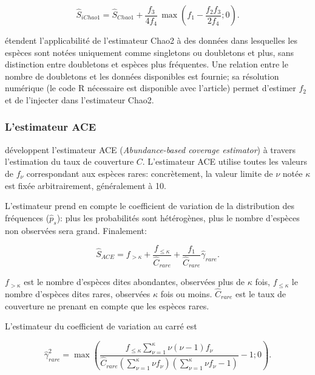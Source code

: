 \documentclass[
  11pt,
  american,
  a4paper,
  extrafontsizes,onecolumn,openright
  ]{memoir}
\begin{document}
\begin{equation}
  \label{eq:iChao1}
  {\hat{S}}_\mathit{iChao1} 
  = {\hat{S}}_\mathit{Chao1} 
    + \frac{f_{3}}{4f_{4}}
    \,\max\left( f_{1} - \frac{f_{2}f_{3}}{2f_{4}} ; 0 \right).
\end{equation}

\textcite{Chao2017} étendent l'applicabilité de l'estimateur Chao2 à des données dans lesquelles les espèces sont notées uniquement comme singletons ou doubletons et plus, sans distinction entre doubletons et espèces plus fréquentes.
Une relation entre le nombre de doubletons et les données disponibles est fournie; sa résolution numérique (le code R nécessaire est disponible avec l'article) permet d'estimer \(f_{2}\) et de l'injecter dans l'estimateur Chao2.

\subsubsection{L'estimateur ACE}\label{lestimateur-ace}

\textcite{Chao1992} développent l'estimateur ACE (\emph{Abundance-based coverage estimator}) à travers l'estimation du taux de couverture \(C\).
L'estimateur ACE utilise toutes les valeurs de \(f_\nu\) correspondant aux espèces rares: concrètement, la valeur limite de \(\nu\) notée \(\kappa\) est fixée arbitrairement, généralement à 10.

L'estimateur prend en compte le coefficient de variation de la distribution des fréquences (\({\hat{p}}_s\)): plus les probabilités sont hétérogènes, plus le nombre d'espèces non observées sera grand.
Finalement:

\begin{equation}
  \label{eq:ACE}
  \hat{S}_{\mathit{ACE}} 
  = f_{>\kappa} + \frac{f_{\le\kappa}}{\hat{C}_\mathit{rare}} + \frac{f_{1}}{{\hat{C}}_\mathit{rare}}{\hat{\gamma}}_\mathit{rare}.
\end{equation}

\(f_{>\kappa}\) est le nombre d'espèces dites abondantes, observées plus de \(\kappa\) fois, \(f_{\le\kappa}\) le nombre d'espèces dites rares, observées \(\kappa\) fois ou moins.
\(\hat{C}_\mathit{rare}\) est le taux de couverture ne prenant en compte que les espèces rares.

L'estimateur du coefficient de variation au carré est

\begin{equation}
  \label{eq:ACEcv}
  \hat{\gamma}^{2}_\mathit{rare} 
  = \max\left( 
    \frac{
      f_{\le\kappa} \sum^{\kappa}_{\nu=1}{\nu\left( \nu - 1 \right){f_\nu}}
    }{
      \hat{C}_\mathit{rare} \left( \sum^{\kappa}_{\nu = 1}{\nu f_{\nu}} \right) \left( \sum^{\kappa}_{\nu = 1}{\nu f_{\nu}} - 1 \right)
    } - 1 ; 0
  \right).
\end{equation}
\end{document}
